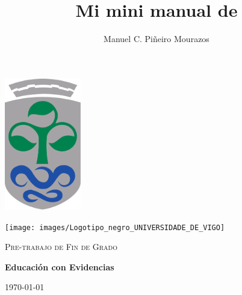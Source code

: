 \documentclass[a4paper, twoside, titlepage, 12pt]{article}
\title{Mi mini manual de \XeLaTeX}
\author{Manuel C. Piñeiro Mourazos}
\begin{document}
\begin{titlepage}
  \centering
	\includegraphics[width=0.25\textwidth]{images/escudo_uvigo}\par\vspace{1cm}
	\texttt{[image: images/Logotipo\_negro\_UNIVERSIDADE\_DE\_VIGO]}\par\vspace{1cm}
	{\scshape\Large Pre-trabajo de Fin de Grado\par}
	\vspace{1.5cm}
	{\huge\bfseries Educación con Evidencias\par}
	\vspace{2cm}
	{\Large\itshape \theauthor\par}
	\vfill
	{\large \today\par}
\end{titlepage}

\tableofcontents %
\end{document}
